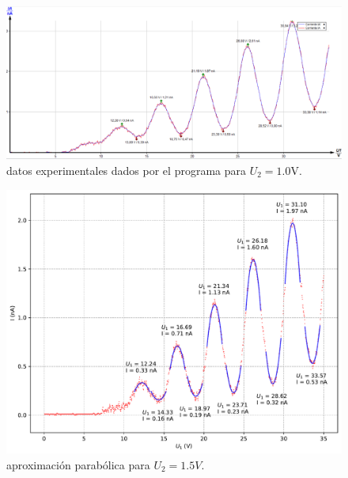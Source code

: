 \documentclass[12pt,a4paper]{article}
\numberwithin{equation}{section}
\numberwithin{figure}{section}
\begin{document}
\begin{figure}[h!]  \centering
\includegraphics[scale=0.5]{1_0-2.png}
\caption{datos experimentales dados por el programa para $U_2=1.0$V.}
\label{Fig:3.41}
\end{figure}
\newpage
\begin{figure}[h!]  \centering
\includegraphics[scale=0.7]{Parabola-5.pdf}
\caption{aproximación parabólica para $U_2=1.5V$.}
\label{Fig:2.5}
\end{figure}
\end{document}
